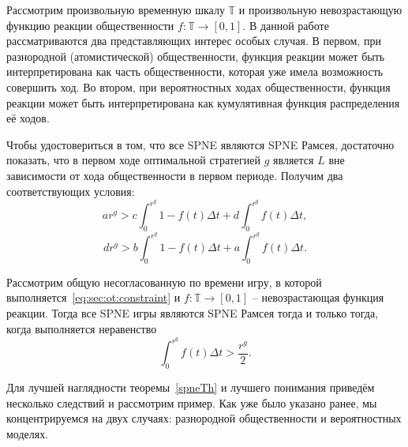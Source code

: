 Рассмотрим произвольную временную шкалу $\mathbb{T}$ и произвольную невозрастающую функцию реакции общественности $f : \mathbb{T} \to [0,1]$. В данной работе рассматриваются два представляющих интерес особых случая. В первом, при разнородной (атомистической) общественности, функция реакции может быть интерпретирована как часть общественности, которая уже имела возможность совершить ход. Во втором, при вероятностных ходах общественности, функция реакции может быть интерпретирована как кумулятивная функция распределения её ходов.

Чтобы удостовериться в том, что все SPNE являются SPNE Рамсея, достаточно показать, что в первом ходе оптимальной стратегией $g$ является $L$ вне зависимости от хода общественности в первом периоде. Получим два соответствующих условия:
\begin{equation}
\label{sec:hetero:main1}
ar^g > c \int_0^{r^g} 1 - f(t) \Delta t + d  \int_0^{r^g} f(t) \Delta t ,
\end{equation}
\begin{equation}
\label{sec:hetero:main2}
dr^g > b \int_0^{r^g} 1 - f(t) \Delta t + a  \int_0^{r^g} f(t) \Delta t .
\end{equation}

\begin{theorem}
	\label{spneTh}
	Рассмотрим общую несогласованную по времени игру, в которой выполняется~\eqref{eq:sec:ot:constraint} и $f : \mathbb{T} \to [0,1]$ -- невозрастающая функция реакции. Тогда все SPNE игры являются SPNE Рамсея тогда и только тогда, когда выполняется неравенство
	\begin{equation}
	\label{sec:hetero:main3}
	\int_0^{r^g} f(t) \Delta t > \frac{r^g}{2} .
	\end{equation}
\end{theorem}

Для лучшей наглядности теоремы~\ref{spneTh} и лучшего понимания приведём несколько следствий и рассмотрим пример. Как уже было указано ранее, мы концентрируемся на двух случаях: разнородной общественности и вероятностных моделях.

